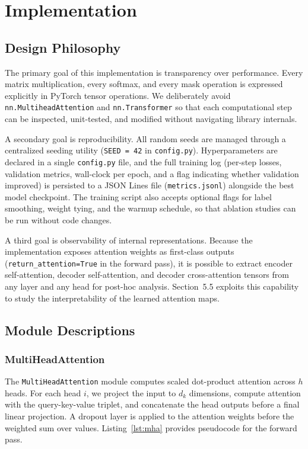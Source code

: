 \documentclass[10pt]{article}
\begin{document}
\section{Implementation}

\subsection{Design Philosophy}

The primary goal of this implementation is transparency over performance. Every matrix multiplication, every softmax, and every mask operation is expressed explicitly in PyTorch tensor operations. We deliberately avoid \texttt{nn.MultiheadAttention} and \texttt{nn.Transformer} so that each computational step can be inspected, unit-tested, and modified without navigating library internals.

A secondary goal is reproducibility. All random seeds are managed through a centralized seeding utility (\texttt{SEED = 42} in \texttt{config.py}). Hyperparameters are declared in a single \texttt{config.py} file, and the full training log (per-step losses, validation metrics, wall-clock per epoch, and a flag indicating whether validation improved) is persisted to a JSON Lines file (\texttt{metrics.jsonl}) alongside the best model checkpoint. The training script also accepts optional flags for label smoothing, weight tying, and the warmup schedule, so that ablation studies can be run without code changes.

A third goal is observability of internal representations. Because the implementation exposes attention weights as first-class outputs (\texttt{return\_attention=True} in the forward pass), it is possible to extract encoder self-attention, decoder self-attention, and decoder cross-attention tensors from any layer and any head for post-hoc analysis. Section~5.5 exploits this capability to study the interpretability of the learned attention maps.

\subsection{Module Descriptions}

\subsubsection{MultiHeadAttention}

The \texttt{MultiHeadAttention} module computes scaled dot-product attention across $h$ heads. For each head $i$, we project the input to $d_k$ dimensions, compute attention with the query-key-value triplet, and concatenate the head outputs before a final linear projection. A dropout layer is applied to the attention weights before the weighted sum over values. Listing~\ref{lst:mha} provides pseudocode for the forward pass.
\end{document}

